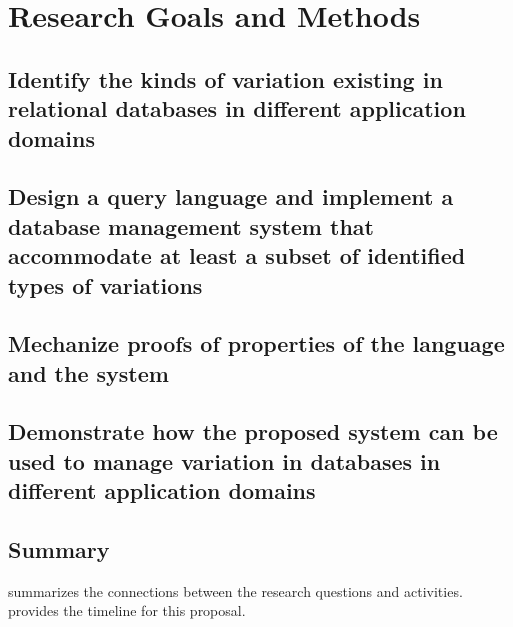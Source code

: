 \section{Research Goals and Methods}
\label{sec:goals}

\subsection{Identify the kinds of variation existing in relational databases in 
different application domains}
\label{sec:ro1}

\subsection{Design a query language and implement a database management 
system that accommodate at least a subset of identified types of variations}
\label{sec:ro2}

\subsection{Mechanize proofs of properties of the language and the system}
\label{sec:ro3}

\subsection{Demonstrate how the proposed system can be used to manage
variation in databases in different application domains}
\label{sec:ro4}


\subsection{Summary}
\label{sec:sum}

 summarizes the connections between the research questions and activities.
 provides the timeline for this proposal.

